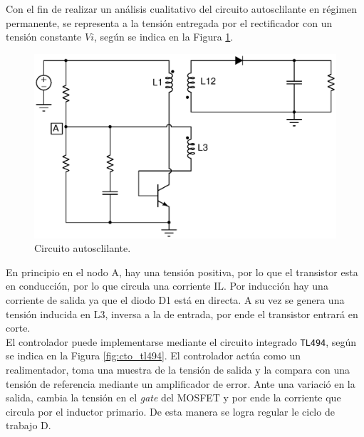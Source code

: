 

Con el fin de realizar un análisis cualitativo del circuito autosclilante en régimen permanente, se representa a la tensión entregada por el rectificador con un tensión constante $Vi$, según se indica en la Figura \ref{fig:cto_auto}. 

\begin{figure}[H]
	\centering
	\includegraphics[scale=0.4]{Figuras/auto.eps}
	\caption{Circuito autosclilante.}
	\label{fig:cto_auto}
\end{figure}


En principio en el nodo A, hay una tensión positiva, por lo que el transistor esta en conducción, por lo que circula una corriente IL. Por inducción hay una corriente de salida ya que el diodo D1 está en directa. A su vez se genera una tensión inducida en L3, inversa a la de entrada, por ende el transistor entrará en corte. \\


El controlador puede implementarse mediante el circuito integrado \texttt{TL494}, según se indica en la Figura \ref{fig:cto_tl494}. El controlador actúa como un realimentador, toma una muestra de la tensión de salida y la compara con una tensión de referencia mediante un amplificador de error. Ante una variació en la salida, cambia la tensión en el \textit{gate} del MOSFET y por ende la corriente que circula por el inductor primario. De esta manera se logra regular le ciclo de trabajo D.


